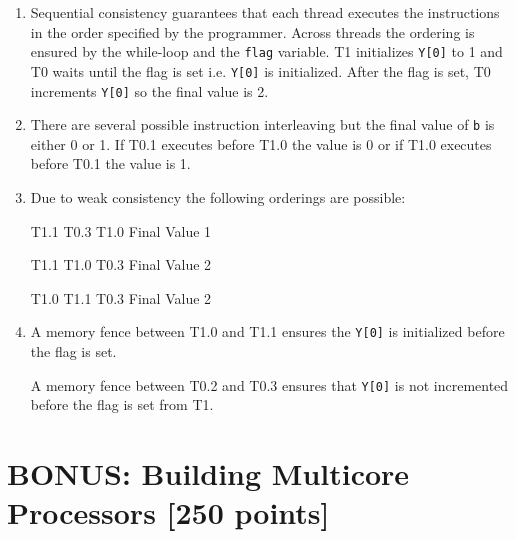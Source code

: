 \documentclass[a4paper]{article}
\begin{document}
\begin{enumerate}[label=\alph*)]
    \item Sequential consistency guarantees that each thread executes the
        instructions in the order specified by the programmer. Across threads
        the ordering is ensured by the while-loop and the \verb|flag| variable.
        T1 initializes \verb|Y[0]| to 1 and T0 waits until the flag is set i.e.
        \verb|Y[0]| is initialized. After the flag is set, T0 increments
        \verb|Y[0]| so the final value is 2.

    \item There are several possible instruction interleaving but the final
        value of \verb|b| is either 0 or 1. If T0.1 executes before T1.0 the
        value is 0 or if T1.0 executes before T0.1 the value is 1.

    \item Due to weak consistency the following orderings are possible:

        T1.1 T0.3 T1.0 Final Value 1

        T1.1 T1.0 T0.3 Final Value 2

        T1.0 T1.1 T0.3 Final Value 2

    \item A memory fence between T1.0 and T1.1 ensures the \verb|Y[0]| is
        initialized before the flag is set.

        A memory fence between T0.2 and T0.3 ensures that \verb|Y[0]| is not
        incremented before the flag is set from T1.
\end{enumerate}

\section{BONUS: Building Multicore Processors [250 points]}
\end{document}
